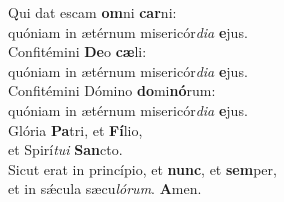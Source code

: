 \oddverse Qui dat escam \textbf{om}ni \textbf{car}ni:~\*\\
\oddverse quóniam in ætérnum misericór\textit{di}\textit{a} \textbf{e}jus.\\
\evenverse Confitémini \textbf{De}o \textbf{cæ}li:~\*\\
\evenverse quóniam in ætérnum misericór\textit{di}\textit{a} \textbf{e}jus.\\
\oddverse Confitémini Dómino \textbf{do}mi\textbf{nó}rum:~\*\\
\oddverse quóniam in ætérnum misericór\textit{di}\textit{a} \textbf{e}jus.\\
\evenverse Glória \textbf{Pa}tri, et \textbf{Fí}lio,~\*\\
\evenverse et Spirí\textit{tu}\textit{i} \textbf{San}cto.\\
\oddverse Sicut erat in princípio, et \textbf{nunc}, et \textbf{sem}per,~\*\\
\oddverse et in sǽcula sæcu\textit{ló}\textit{rum}. \textbf{A}men.\\
